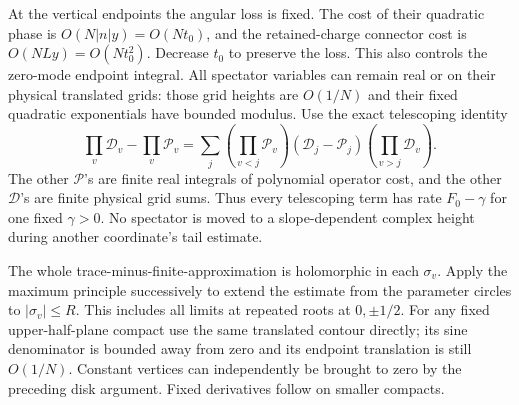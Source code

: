 At the vertical endpoints the angular loss is fixed. The cost of their quadratic phase is $O(N|n|y)=O(Nt_0)$, and the retained-charge connector cost
is $O(NLy)=O(Nt_0^2)$. Decrease $t_0$ to preserve the loss. This
also controls the zero-mode endpoint integral. All spectator variables can
remain real or on their physical translated grids: those grid
heights are $O(1/N)$ and their fixed quadratic exponentials have bounded modulus.
Use the exact telescoping identity
\[
 \prod_v\mathcal D_v-\prod_v\mathcal P_v
 =\sum_j(\prod_{v<j}\mathcal P_v)
                   (\mathcal D_j-\mathcal P_j)
                   (\prod_{v>j}\mathcal D_v).
\]
The other $\mathcal P$'s are finite real integrals of polynomial
operator cost, and the other $\mathcal D$'s are finite physical
grid sums. Thus every telescoping term has rate $F_0-\gamma$ for
one fixed $\gamma>0$. No spectator is moved to a slope-dependent
complex height during another coordinate's tail estimate.

The whole trace-minus-finite-approximation is holomorphic in each
$\sigma_v$. Apply the maximum principle successively to extend
the estimate from the parameter circles to $|\sigma_v|\le R$.
This includes all limits at repeated roots at $0,\pm1/2$. For any fixed
upper-half-plane compact use the same translated contour directly;
its sine denominator is bounded away from zero and its endpoint
translation is still $O(1/N)$. Constant vertices can independently
be brought to zero by the preceding disk argument. Fixed
derivatives follow on smaller compacts.


